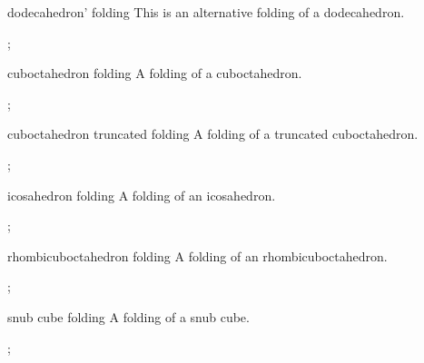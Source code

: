\begin{pictype}{dodecahedron' folding}{}
    This is an alternative folding of a dodecahedron.
\begin{codeexample}[preamble={\usetikzlibrary{folding}}]
\tikz {};
\end{codeexample}
\end{pictype}

\begin{pictype}{cuboctahedron folding}{}
    A folding of a cuboctahedron.
\begin{codeexample}[preamble={\usetikzlibrary{folding}}]
\tikz {};
\end{codeexample}
\end{pictype}

\begin{pictype}{cuboctahedron truncated folding}{}
    A folding of a truncated cuboctahedron.
\begin{codeexample}[preamble={\usetikzlibrary{folding}}]
\tikz {};
\end{codeexample}
\end{pictype}

\begin{pictype}{icosahedron folding}{}
    A folding of an icosahedron.
\begin{codeexample}[preamble={\usetikzlibrary{folding}}]
\tikz {};
\end{codeexample}
\end{pictype}

\begin{pictype}{rhombicuboctahedron folding}{}
    A folding of an rhombicuboctahedron.
\begin{codeexample}[preamble={\usetikzlibrary{folding}}]
\tikz {};
\end{codeexample}
\end{pictype}

\begin{pictype}{snub cube folding}{}
    A folding of a snub cube.
\begin{codeexample}[width=5cm,preamble={\usetikzlibrary{folding}}]
\tikz {};
\end{codeexample}
\end{pictype}

